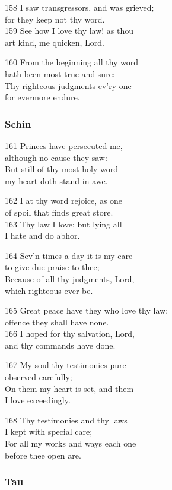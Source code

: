\begin{multicols}{3}
158 I saw transgressors, and was grieved;\\
for they keep not thy word.\\
159 See how I love thy law! as thou\\
art kind, me quicken, Lord.

160 From the beginning all thy word\\
hath been most true and sure:\\
Thy righteous judgments ev’ry one\\
for evermore endure.

\subsubsection*{Schin}

161 Princes have persecuted me,\\
although no cause they saw:\\
But still of thy most holy word\\
my heart doth stand in awe.

162 I at thy word rejoice, as one\\
of spoil that finds great store.\\
163 Thy law I love; but lying all\\
I hate and do abhor.

164 Sev’n times a-day it is my care\\
to give due praise to thee;\\
Because of all thy judgments, Lord,\\
which righteous ever be.

165 Great peace have they who love thy law;\\
offence they shall have none.\\
166 I hoped for thy salvation, Lord,\\
and thy commands have done.

167 My soul thy testimonies pure\\
observed carefully;\\
On them my heart is set, and them\\
I love exceedingly.

168 Thy testimonies and thy laws\\
I kept with special care;\\
For all my works and ways each one\\
before thee open are.

\subsubsection*{Tau}


\end{multicols}
